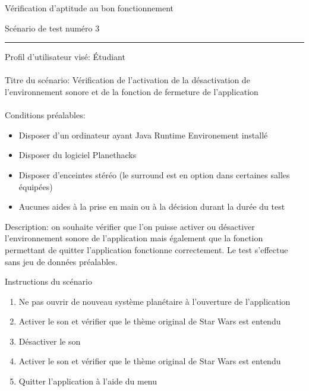 \documentclass[a4paper,10pt]{article}
\begin{document}
\newpage
{}

\begin{center}
  \begin{huge}
    Vérification d'aptitude au bon fonctionnement \\
  \end{huge}
  \vspace{1cm}
  \begin{Large}
    Scénario de test numéro 3
  \end{Large}
\end{center}
\rule{\linewidth}{.5pt}
Profil d'utilisateur visé: Étudiant \\\\
Titre du scénario: Vérification de l'activation de la désactivation de l'environnement sonore et de la fonction de fermeture de l'application \\\\
Conditions préalables:
\begin{itemize}
 \item Disposer d'un ordinateur ayant Java Runtime Environement installé
 \item Disposer du logiciel Planethacks
 \item Disposer d'enceintes stéréo (le surround est en option dans certaines salles équipées) 
 \item Aucunes aides à la prise en main ou à la décision durant la durée du test
\end{itemize}
Description: on souhaite vérifier que l'on puisse activer ou désactiver l'environnement sonore de l'application mais également
que la fonction permettant de quitter l'application fonctionne correctement.
Le test s'effectue sans jeu de données préalables.
\begin{center}
 \begin{Large}
    Instructions du scénario
  \end{Large}
\end{center}
\begin{enumerate}
 \item Ne pas ouvrir de nouveau système planétaire à l'ouverture de l'application
 \item Activer le son et vérifier que le thème original de Star Wars est entendu
 \item Désactiver le son
 \item Activer le son et vérifier que le thème original de Star Wars est entendu
 \item Quitter l'application à l'aide du menu
\end{enumerate}
\end{document}
